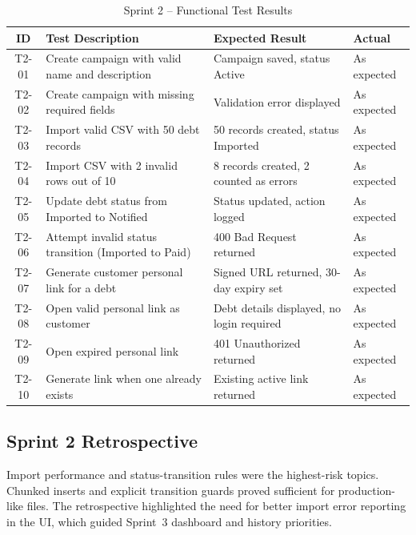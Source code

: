 \documentclass[12pt,a4paper]{report}
\newcommand{\reporttablesetup}{%
  \small%
  \setlength{\tabcolsep}{5pt}%
  \renewcommand{\arraystretch}{1.22}%
  \arrayrulecolor{framegray}%
}
\begin{document}
\begin{table}[!htbp]
  \centering
  \footnotesize\reporttablesetup
  \begin{tabularx}{\textwidth}{|c|Y|p{3.85cm}|p{1.8cm}|}
    \hline
    \textbf{ID} & \textbf{Test Description} & \textbf{Expected Result}
      & \textbf{Actual} \\
    \hline
    T2-01 & Create campaign with valid name and description &
      Campaign saved, status Active & As expected \\
    \hline
    T2-02 & Create campaign with missing required fields &
      Validation error displayed & As expected \\
    \hline
    T2-03 & Import valid CSV with 50 debt records &
      50 records created, status Imported & As expected \\
    \hline
    T2-04 & Import CSV with 2 invalid rows out of 10 &
      8 records created, 2 counted as errors & As expected \\
    \hline
    T2-05 & Update debt status from Imported to Notified &
      Status updated, action logged & As expected \\
    \hline
    T2-06 & Attempt invalid status transition (Imported to Paid) &
      400 Bad Request returned & As expected \\
    \hline
    T2-07 & Generate customer personal link for a debt &
      Signed URL returned, 30-day expiry set & As expected \\
    \hline
    T2-08 & Open valid personal link as customer &
      Debt details displayed, no login required & As expected \\
    \hline
    T2-09 & Open expired personal link &
      401 Unauthorized returned & As expected \\
    \hline
    T2-10 & Generate link when one already exists &
      Existing active link returned & As expected \\
    \hline
  \end{tabularx}
  \caption{Sprint 2 -- Functional Test Results}
  \label{tab:test-s2}
\end{table}

\subsection{Sprint 2 Retrospective}

Import performance and status-transition rules were the highest-risk topics.
Chunked inserts and explicit transition guards proved sufficient for production-like
files.
The retrospective highlighted the need for better import error reporting in the UI,
which guided Sprint~3 dashboard and history priorities.
\end{document}
